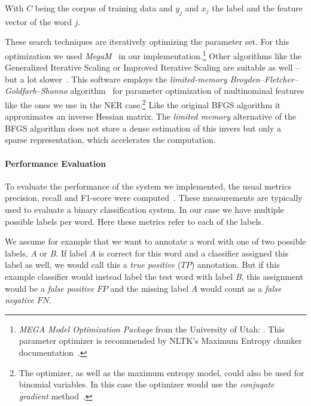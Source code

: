 		With $C$ being the corpus of training data and $y_j$ and $x_j$ the label and the feature vector of the word $j$.

		These search techniques are iteratively optimizing the parameter set. For this optimization we used \textit{MegaM}~\cite{daume2008megam,daume04cg-bfgs} in our implementation.\footnote{\textit{MEGA Model Optimization Package} from the University of Utah: . This parameter optimizer is recommended by \ac{NLTK}'s Maximum Entropy chunker documentation~\cite{nltk2017chunkne}.}
		Other algorithms like the Generalized Iterative Scaling or Improved Iterative Scaling are suitable as well -- but a lot slower~\cite{nltkinfoextract}.
		This software employs the \textit{limited-memory Broyden–Fletcher–Goldfarb–Shanno} algorithm~\cite{liu1989limited} for parameter optimization of multinominal features like the ones we use in the \ac{NER} case.\footnote{The optimizer, as well as the maximum entropy model, could also be used for binomial variables. In this case the optimizer would use the \textit{conjugate gradient} method~\cite{shewchuk1994introduction}.}
		Like the original \ac{BFGS} algorithm it approximates an inverse Hessian matrix. The \textit{limited memory} alternative of the \ac{BFGS} algorithm does not store a dense estimation of this invers but only a sparse representation, which accelerates the computation.

		\paragraph{Performance Evaluation}
		\label{sec:nerWithNltkPerformanceEval}
		To evaluate the performance of the system we implemented, the usual metrics precision, recall and F1-score were computed~\cite{ferri2009experimental, powers2011evaluation}. These measurements are typically used to evaluate a binary classification system. In our case we have multiple possible labels per word. Here these metrics refer to each of the labels.

		We assume for example that we want to annotate a word with one of two possible labels, \textit{A} or \textit{B}. If label \textit{A} is correct for this word and a classifier assigned this label as well, we would call this a \textit{true positive} (\(TP\)) annotation. But if this example classifier would instead label the test word with label \textit{B}, this assignment would be a \textit{false positive} \(FP\) and the missing label \textit{A} would count as a \textit{false negative} \(FN\).

